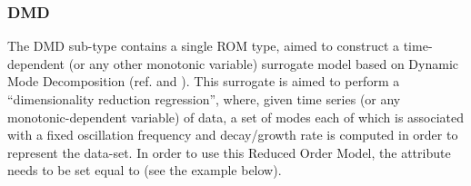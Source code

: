 \subsubsection{DMD}
\label{subsubsec:polyexponential}
The DMD sub-type contains a single ROM type, aimed to construct a time-dependent (or any other monotonic
variable) surrogate model based on Dynamic Mode Decomposition (ref. \cite{Schmid2010DMD} and \cite{Vega2017HODMD}).
This surrogate is aimed to perform a ``dimensionality reduction regression'', where, given time series (or any monotonic-dependent
variable) of data, a set of modes each of which is associated with a fixed oscillation frequency and decay/growth rate is computed
in order to represent the data-set.
%
In order to use this Reduced Order Model, the  attribute
 needs to be set equal to  (see the example
below).
%
\subnodeIntro

